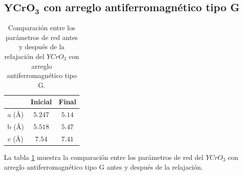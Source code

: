 \subsection{$\mathbf{YCrO_{3}}$ con arreglo antiferromagn\'etico tipo G}

\begin{table}[H]
    \begin{center}
        \caption{Comparaci\'on entre los par\'ametros de red antes y despu\'es 
            de la relajaci\'on del $YCrO_{3}$ con arreglo antiferromagn\'etico 
            tipo G.}
        \begin{tabular}{ccc}
            \hline
            & \textbf{Inicial} \cite{geller1956} & \textbf{Final} \\
            \hline \hline
            a (\AA) & $5.247$  & $5.14$   \\
            \hline
            b (\AA) & $5.518$ & $5.47$   \\
            \hline
            c (\AA) & $7.54$ & $7.41$   \\
            \hline
        \end{tabular}
        \singlespace
        \label{yco_g_ini_fin}
    \end{center}
\end{table}

\noindent La tabla \ref{yco_g_ini_fin} muestra la comparaci\'on entre los 
par\'ametros de red del $YCrO_{3}$ con arreglo antiferromagn\'etico tipo G 
antes y despu\'es de la relajaci\'on.

